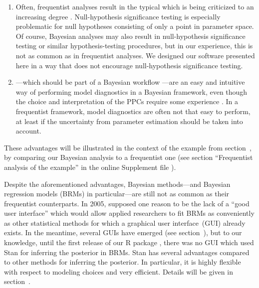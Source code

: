 \begin{enumerate}
  \item Often, frequentist analyses result in the typical  which is being criticized to an increasing degree
  \citep{amrhein_remove_2018, amrhein_scientists_2019,
  mcshane_abandon_2019}. Null-hypothesis significance testing is especially
  problematic for null hypotheses consisting of only a point in parameter
  space. Of course, Bayesian analyses may also result in null-hypothesis
  significance testing or similar hypothesis-testing procedures, but in our
  experience, this is not as common as in frequentist analyses. We designed our
  software presented here in a way that does not encourage null-hypothesis
  significance testing.

  \item {}---which should be part of a
  Bayesian workflow \citep{gelman_bayesian_2020}---are an easy and intuitive
  way of performing model diagnostics in a Bayesian framework, even though the
  choice and interpretation of the PPCs require some experience
  \citep{gelman_bayesian_2020}. In a frequentist framework, model
  diagnostics are often not that easy to perform, at least if the uncertainty
  from parameter estimation should be taken into account.
\end{enumerate}

These advantages will be illustrated in the context of the example from
section~, by comparing our Bayesian analysis to a frequentist
one (see section ``Frequentist analysis of the example'' in the online
Supplement file ).

Despite the aforementioned advantages, Bayesian methods---and Bayesian
regression models (BRMs) in particular---are still not as common as their
frequentist counterparts. In 2005, \citet{woodward_bugsxla_2005} supposed one
reason to be the lack of a ``good user interface'' which would allow
applied researchers to fit BRMs as conveniently as other statistical methods
for which a graphical user interface~(GUI) already exists. In the meantime,
several GUIs have emerged (see section~), but to our knowledge,
until the first release of our R package
 \citep{weber_shinybrms_2021}, there was no GUI which used
Stan \citep{carpenter_stan:_2017, stan_development_team_stan_2022} for
inferring the posterior in BRMs. Stan has several advantages compared to other
methods for inferring the posterior. In particular, it is highly flexible with
respect to modeling choices and very efficient. Details will be given in
section~.

